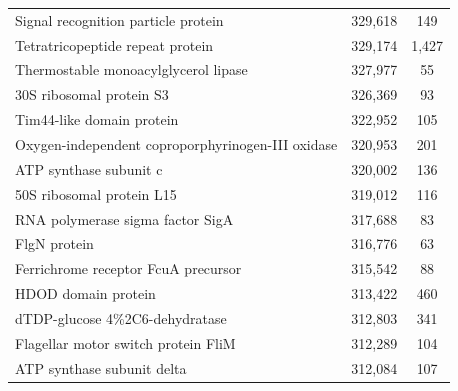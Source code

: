 \begin{singlespace}
\begin{longtable}{p{} cc}
                                                       Signal recognition particle protein &                     329,618 &           149 \\
                                                          Tetratricopeptide repeat protein &                     329,174 &         1,427 \\
                                                      Thermostable monoacylglycerol lipase &                     327,977 &            55 \\
                                                                  30S ribosomal protein S3 &                     326,369 &            93 \\
                                                                 Tim44-like domain protein &                     322,952 &           105 \\
                                         Oxygen-independent coproporphyrinogen-III oxidase &                     320,953 &           201 \\
                                                                    ATP synthase subunit c &                     320,002 &           136 \\
                                                                 50S ribosomal protein L15 &                     319,012 &           116 \\
                                                          RNA polymerase sigma factor SigA &                     317,688 &            83 \\
                                                                              FlgN protein &                     316,776 &            63 \\
                                                       Ferrichrome receptor FcuA precursor &                     315,542 &            88 \\
                                                                       HDOD domain protein &                     313,422 &           460 \\
                                                            dTDP-glucose 4\%2C6-dehydratase &                     312,803 &           341 \\
                                                       Flagellar motor switch protein FliM &                     312,289 &           104 \\
                                                                ATP synthase subunit delta &                     312,084 &           107 \\

\end{longtable}
\end{singlespace}
